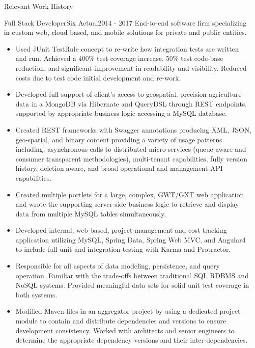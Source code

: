 \documentclass[]{mcdowellcv}
\begin{document}
	\begin{cvsection}{Relevant Work History}
		\begin{cvsubsection}{Full Stack Developer}{Six Actual}{2014 - 2017}
			End-to-end software firm specializing in custom web, cloud based, and mobile solutions for private and public entities.
			\vspace{5pt}
			\begin{itemize} 			
				\item Used JUnit TestRule concept to re-write how integration tests are written and run.  Achieved a 400\% test coverage increase, 50\% test code-base reduction, and significant improvement in readability and visibility.  Reduced costs due to test code initial development and re-work.
				\\
				\item Developed full support of client's access to geospatial, precision agriculture data in a MongoDB via Hibernate and QueryDSL through REST endpoints, supported by appropriate business logic accessing a MySQL database.
				\\
				\item Created REST frameworks with Swagger annotations producing XML, JSON, geo-spatial, and binary content providing a variety of usage patterns including: asynchronous calls to distributed micro-services (queue-aware and consumer transparent methodologies), multi-tenant capabilities, fully version history, deletion aware, and broad operational and management API capabilities.
				\\
				\item Created multiple portlets for a large, complex, GWT/GXT web application and wrote the supporting server-side business logic to retrieve and display data from multiple MySQL tables simultaneously.
				\\
				\item Developed internal, web-based, project management and cost tracking application utilizing MySQL, Spring Data, Spring Web MVC, and Angular4 to include full unit and integration testing with Karma and Protractor.
				\\
				\item Responsible for all aspects of data modeling, persistence, and query operation.  Familiar with the trade-offs between traditional SQL RDBMS and NoSQL systems. Provided meaningful data sets for solid unit test coverage in both systems.
				\\
				\item Modified Maven files in an aggregator project by using a dedicated project module to contain and distribute dependencies and versions to ensure development consistency.  Worked with architects and senior engineers to determine the appropriate dependency versions and their inter-dependencies.

\end{itemize}
\end{cvsubsection}
\end{cvsection}
\end{document}
